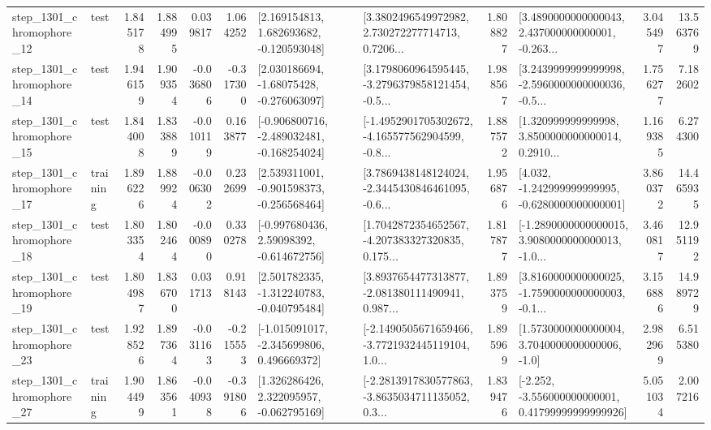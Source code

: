 \begin{tabular}{llrrrrllrlrr}
 step\_1301\_chromophore\_12 &      test &      1.845178 &    1.884995 &      0.039817 &  1.064252 &    [2.169154813, 1.682693682, -0.120593048] &  [3.3802496549972982, 2.730272277714713, 0.7206... &       1.808827 &  [3.4890000000000043, 2.437000000000001, -0.263... &            3.045497 &         13.563769 \\
 step\_1301\_chromophore\_14 &      test &      1.946159 &    1.909354 &     -0.036806 & -0.317300 &    [2.030186694, -1.68075428, -0.276063097] &  [3.1798060964595445, -3.2796379858121454, -0.5... &       1.988567 &  [3.2439999999999998, -2.5960000000000036, -0.5... &            1.756277 &          7.182602 \\
 step\_1301\_chromophore\_15 &      test &      1.844008 &    1.833889 &     -0.010119 &  0.163877 &  [-0.906800716, -2.489032481, -0.168254024] &  [-1.4952901705302672, -4.165577562904599, -0.8... &       1.887572 &  [1.320999999999998, 3.8500000000000014, 0.2910... &            1.169385 &          6.274300 \\
 step\_1301\_chromophore\_17 &  training &      1.896226 &    1.889924 &     -0.006302 &  0.232699 &   [2.539311001, -0.901598373, -0.256568464] &  [3.7869438148124024, -2.3445430846461095, -0.6... &       1.956876 &   [4.032, -1.242999999999995, -0.6280000000000001] &            3.860372 &         14.465935 \\
 step\_1301\_chromophore\_18 &      test &      1.803354 &    1.802464 &     -0.000890 &  0.330278 &    [-0.997680436, 2.59098392, -0.614672756] &  [1.7042872354652567, -4.207383327320835, 0.175... &       1.817877 &  [-1.2890000000000015, 3.9080000000000013, -1.0... &            3.460817 &         12.951192 \\
 step\_1301\_chromophore\_19 &      test &      1.804987 &    1.836700 &      0.031713 &  0.918143 &   [2.501782335, -1.312240783, -0.040795484] &  [3.8937654477313877, -2.081380111490941, 0.987... &       1.893759 &  [3.8160000000000025, -1.7590000000000003, -0.1... &            3.156886 &         14.989729 \\
 step\_1301\_chromophore\_23 &      test &      1.928526 &    1.897364 &     -0.031163 & -0.215553 &   [-1.015091017, -2.345699806, 0.496669372] &  [-2.1490505671659466, -3.7721932445119104, 1.0... &       1.895969 &     [1.5730000000000004, 3.7040000000000006, -1.0] &            2.982969 &          6.515380 \\
 step\_1301\_chromophore\_27 &  training &      1.904499 &    1.863561 &     -0.040938 & -0.391806 &    [1.326286426, 2.322095957, -0.062795169] &  [-2.2813917830577863, -3.8635034711135052, 0.3... &       1.839476 &  [-2.252, -3.556000000000001, 0.41799999999999926] &            5.051034 &          2.007216 \\

\end{tabular}
